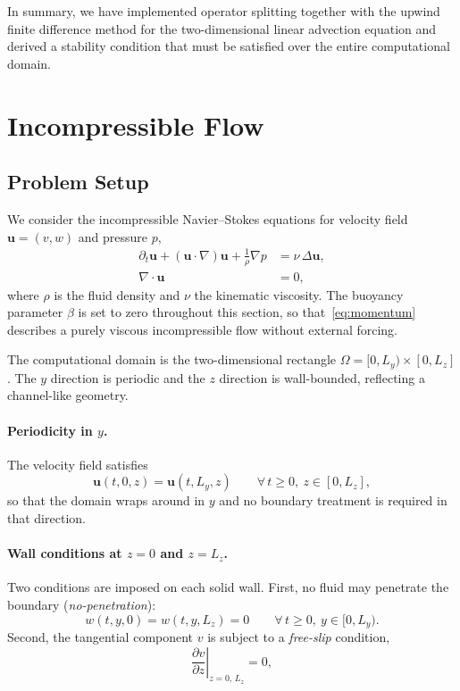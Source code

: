 In summary, we have implemented operator splitting together with the
upwind finite difference method for the two-dimensional linear advection
equation and derived a stability condition that must be satisfied over the
entire computational domain.
\newpage

\section{Incompressible Flow}\label{Chorins}

\subsection{Problem Setup}

We consider the incompressible Navier--Stokes equations for velocity field $\mathbf{u} = (v,w)$ and pressure $p$,
\begin{align}
    \partial_t \mathbf{u} + (\mathbf{u} \cdot \nabla)\mathbf{u}
        + \frac{1}{\rho}\nabla p
        &= \nu \,\Delta \mathbf{u}, \label{eq:momentum} \\
    \nabla \cdot \mathbf{u} &= 0, \label{eq:incompressibility} 
\end{align}
where $\rho$ is the fluid density and $\nu$ the kinematic viscosity. The buoyancy parameter $\beta$ is set to zero throughout this section, so that~\eqref{eq:momentum} describes a purely viscous incompressible flow without external forcing.

The computational domain is the two-dimensional rectangle $\Omega = [0, L_y) \times [0, L_z]$. The $y$ direction is periodic and the $z$ direction is wall-bounded, reflecting a channel-like geometry.

\paragraph{Periodicity in $y$.}
The velocity field satisfies
\begin{equation}
    \mathbf{u}(t, 0, z) = \mathbf{u}(t, L_y, z)
    \qquad \forall\, t \geq 0,\ z \in [0, L_z],
\end{equation}
so that the domain wraps around in $y$ and no boundary treatment is required in that direction. 

\paragraph{Wall conditions at $z = 0$ and $z = L_z$.}
Two conditions are imposed on each solid wall. First, no fluid may penetrate the boundary (\textit{no-penetration}):
\begin{equation}
    w(t, y, 0) = w(t, y, L_z) = 0
    \qquad \forall\, t \geq 0,\ y \in [0, L_y).
    \label{eq:no-penetration}
\end{equation}
Second, the tangential component $v$ is subject to a \textit{free-slip} condition,
\begin{equation}
    \left.\frac{\partial v}{\partial z}\right|_{z=0,\,L_z} = 0,
    \label{eq:free-slip}
\end{equation}

